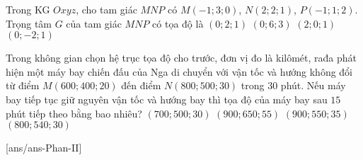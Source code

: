 \begin{ex}%
Trong KG $Oxyz$, cho tam giác $MNP$ có $M(-1;3;0)$, $N(2;2;1)$, $P(-1;1;2)$. Trọng tâm $G$ của tam giác $MNP$ có tọa độ là
\choice
{\True $(0;2;1)$}
{$(0;6;3)$}
{$(2;0;1)$}
{$(0;-2;1)$}
\end{ex}


\begin{ex}%
Trong không gian chọn hệ trục tọa độ cho trước, đơn vị đo là kilômét, rađa phát hiện một máy bay chiến đấu của Nga di chuyển với vận tốc và hướng không đổi từ điểm $M(600;400;20)$ đến điểm $N(800;500;30)$ trong $30$ phút. Nếu máy bay tiếp tục giữ nguyên vận tốc và hướng bay thì tọa độ của máy bay sau $15$ phút tiếp theo bằng bao nhiêu?
\choice
{$(700;500;30)$}
{$(900;650;55)$}
{\True $(900;550;35)$}
{$(800;540;30)$}
\end{ex}


\TNTF
{}[ans/ans\currfilebase-Phan-II]


